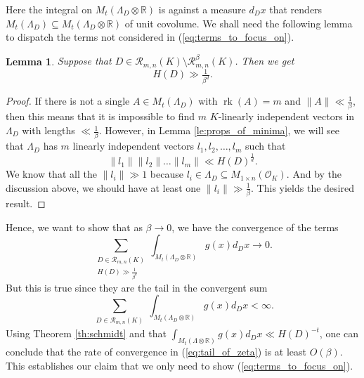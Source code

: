 \documentclass{amsart}
\newtheorem{lemma}[theorem]{Lemma}
\newcommand{\OK}{\mathcal{O}_K}
\DeclareMathOperator{\rank}{rk}
\begin{document}
Here the integral on $M_t(\Lambda_D \otimes \mathbb{R})$ is against a measure  $d_Dx$
that renders $M_t(\Lambda_D)\subseteq M_t(\Lambda_D \otimes \mathbb{R})$ of unit covolume. 
We shall need the following lemma to dispatch the terms not considered in (\ref{eq:terms_to_focus_on}).
\begin{lemma}
\label{le:everything_else}
Suppose that $D \in \mathcal{R}_{m,n}(K) \setminus \mathcal{R}_{m,n}^{\beta}(K)$. Then
we get 
\begin{equation}
  H(D) \gg \tfrac{1}{\beta^{d}}.
\end{equation}
\end{lemma}
\begin{proof}
	If there is not a single $A \in M_t(\Lambda_D)$ with $\rank (A) = m$ and $\|A\| \ll \frac{1}{\beta}$, then this means that it is impossible to find $m$ $K$-linearly independent vectors in $\Lambda_D$ with lengths $\ll \tfrac{1}{\beta}$. 
	However, in Lemma \ref{le:props_of_minima}, we will see that $\Lambda_D$ has $m$ linearly independent vectors $l_1,l_2,\dots,l_m$ such that 
	\begin{equation}
	  \|l_1\| \|l_2\| \dots \|l_m\| \ll H(D)^{\frac{1}{d}}.
	\end{equation}
	We know that all the $\|l_i\| \gg 1$ because $l_i \in \Lambda_D \subseteq M_{1 \times n}(\OK)$. And by the discussion above, we should have at least one $\|l_i\| \gg \frac{1}{\beta}$. This yields the desired result.
\end{proof}


Hence, we want to show that as $\beta \rightarrow 0$, we have the convergence of the terms
\begin{equation}
	\sum_{\substack{D \in \mathcal{R}_{m,n}(K)  \\ H(D) \gg \frac{1}{\beta^{d}} }} \int_{M_t( \Lambda_D \otimes \mathbb{R} )} g(x) d_D x \rightarrow 0.
\label{eq:tail_of_zeta}
\end{equation}
But this is true since they are the tail in the convergent sum
\begin{equation}
	\sum_{\substack{D \in \mathcal{R}_{m,n}(K)  }} \int_{M_t(\Lambda_D \otimes \mathbb{R} )} g(x) d_D x  < \infty.
\end{equation}
Using Theorem \ref{th:schmidt} and that $\int_{M_t(\Lambda \otimes \mathbb{R})} g(x) d_D x \ll H(D)^{-t}$, one can conclude that the rate of convergence in (\ref{eq:tail_of_zeta}) is at least $O(\beta)$. This establishes our claim that we only need to show (\ref{eq:terms_to_focus_on}).
\end{document}
